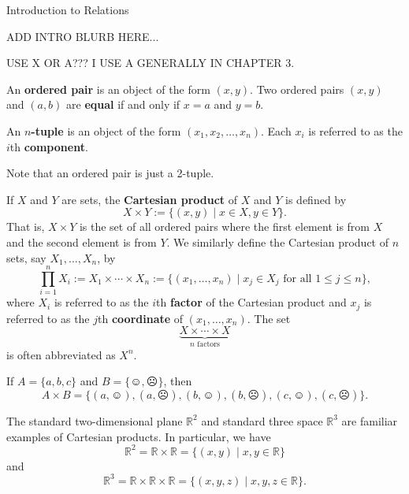 \begin{section}{Introduction to Relations}

ADD INTRO BLURB HERE...

USE X OR A???  I USE A GENERALLY IN CHAPTER 3.

\begin{definition}
An \textbf{ordered pair} is an object of the form $(x,y)$. Two ordered pairs $(x,y)$ and $(a,b)$ are \textbf{equal} if and only if $x=a$ and $y=b$. 
\end{definition}

\begin{definition}
An \textbf{$n$-tuple} is an object of the form $(x_1, x_2,\ldots,x_n)$.  Each $x_i$ is referred to as the $i$th \textbf{component}.
\end{definition}

Note that an ordered pair is just a 2-tuple.

\begin{definition}
If $X$ and $Y$ are sets, the \textbf{Cartesian product} of $X$ and $Y$ is defined by
\[
X\times Y:=\{(x,y)\mid x\in X, y\in Y\}.
\]
That is, $X\times Y$ is the set of all ordered pairs where the first element is from $X$ and the second element is from $Y$.  We similarly define the Cartesian product of $n$ sets, say $X_1, \ldots, X_n$, by
\[
\prod_{i=1}^{n} X_i:=X_1\times \cdots \times X_n:=\{(x_1,\ldots,x_n)\mid  x_j\in X_j \mbox{ for all }1\leq j\leq n\},
\]
where $X_i$ is referred to as the $i$th \textbf{factor} of the Cartesian product and $x_j$ is referred to as the $j$th \textbf{coordinate} of $(x_1,\ldots,x_n)$. The set 
\[
\underbrace{X\times \cdots \times X}_{n\text{ factors}}
\]
is often abbreviated as $X^n$.
\end{definition}

\begin{example}\label{ex:CartesianProduct}
If $A=\{a,b,c\}$ and $B=\{\smiley,\frownie\}$, then 
\[
A\times B=\{(a,\smiley), (a,\frownie),(b,\smiley),(b,\frownie), (c,\smiley),(c,\frownie)\}.
\]
\end{example}

\begin{example}\label{ex:CartesianProduct}
The standard two-dimensional plane $\mathbb{R}^2$ and standard three space $\mathbb{R}^{3}$ are familiar examples of Cartesian products.  In particular, we have
\[
\mathbb{R}^2=\mathbb{R}\times \mathbb{R}=\{(x,y)\mid x,y\in \mathbb{R}\}
\]
and
\[
\mathbb{R}^3=\mathbb{R}\times \mathbb{R}\times \mathbb{R}=\{(x,y,z)\mid x,y,z\in \mathbb{R}\}.
\]
\end{example}


\end{section}
